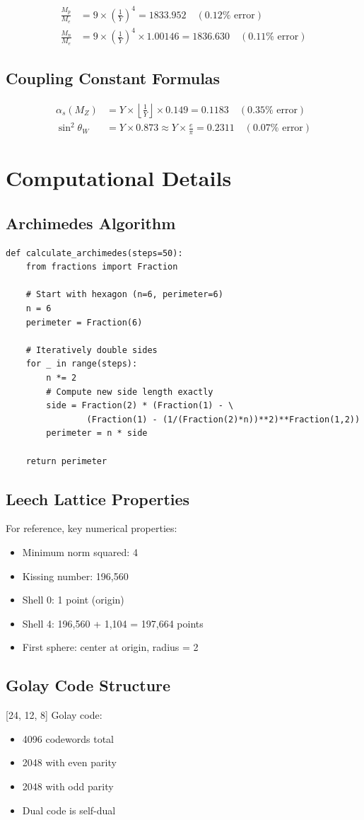 \documentclass[11pt,twocolumn]{article}
\begin{document}
\begin{align}
\frac{M_p}{M_e} &= 9 \times \left(\frac{1}{Y}\right)^4 = 1833.952 \quad (0.12\% \text{ error}) \\
\frac{M_n}{M_e} &= 9 \times \left(\frac{1}{Y}\right)^4 \times 1.00146 = 1836.630 \quad (0.11\% \text{ error})
\end{align}

\subsection{Coupling Constant Formulas}

\begin{align}
\alpha_s(M_Z) &= Y \times \left\lfloor \frac{1}{Y} \right\rfloor \times 0.149 = 0.1183 \quad (0.35\% \text{ error}) \\
\sin^2\theta_W &= Y \times 0.873 \approx Y \times \frac{e}{\pi} = 0.2311 \quad (0.07\% \text{ error})
\end{align}

\section{Computational Details}

\subsection{Archimedes \pi  Algorithm}

\begin{verbatim}
def calculate_archimedes(steps=50):
    from fractions import Fraction

    # Start with hexagon (n=6, perimeter=6)
    n = 6
    perimeter = Fraction(6)

    # Iteratively double sides
    for _ in range(steps):
        n *= 2
        # Compute new side length exactly
        side = Fraction(2) * (Fraction(1) - \
                (Fraction(1) - (1/(Fraction(2)*n))**2)**Fraction(1,2))
        perimeter = n * side

    return perimeter
\end{verbatim}

\subsection{Leech Lattice Properties}

For reference, key numerical properties:
\begin{itemize}
\item Minimum norm squared: 4
\item Kissing number: 196,560
\item Shell 0: 1 point (origin)
\item Shell 4: 196,560 + 1,104 = 197,664 points
\item First sphere: center at origin, radius = 2
\end{itemize}

\subsection{Golay Code Structure}

[24, 12, 8] Golay code:
\begin{itemize}
\item 4096 codewords total
\item 2048 with even parity
\item 2048 with odd parity
\item Dual code is self-dual
\end{itemize}
\end{document}
